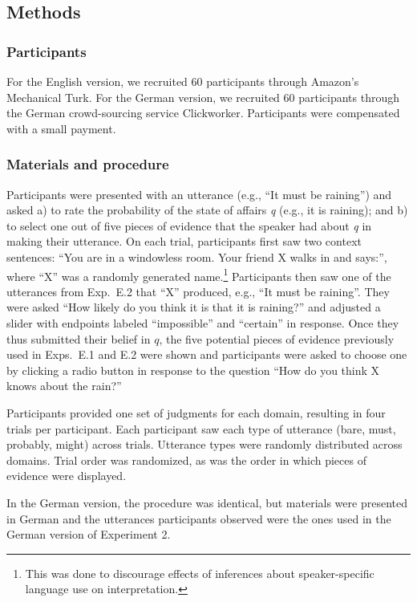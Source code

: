 \documentclass[11pt]{article}
\begin{document}
\subsection{Methods}

\subsubsection{Participants}

For the English version, we recruited 60 participants through Amazon's Mechanical Turk. 
For the German version, we recruited 60 participants through the German crowd-sourcing service Clickworker. Participants were compensated with a small payment.

\subsubsection{Materials and procedure}

Participants were presented with an utterance (e.g., ``It must be raining'') and asked a) to rate the probability of the state of affairs \emph{q} (e.g., it is raining); and b) to select one out of five pieces of evidence that the speaker had about \emph{q} in making their utterance. On each trial, participants first saw two context sentences: ``You are in a windowless room. Your friend X walks in and says:'', where ``X'' was a randomly generated name.\footnote{This was done to discourage effects of inferences about speaker-specific language use on interpretation.} Participants then saw one of the utterances from Exp.~E.2 that ``X'' produced, e.g., ``It must be raining''. They were asked ``How likely do you think it is that it is raining?'' and adjusted a slider with endpoints labeled ``impossible'' and ``certain'' in response. Once they thus submitted their belief in $q$, the five potential pieces of evidence previously used in Exps.~E.1 and E.2 were shown and participants were asked to choose one by clicking a radio button in response to the question ``How do you think X knows about the rain?'' 

Participants provided one set of judgments for each domain, resulting in four trials per participant. Each participant saw each type of utterance (bare, must, probably, might)  across trials. Utterance types were randomly distributed across domains. Trial order was randomized, as was the order in which pieces of evidence were displayed.

In the German version, the procedure was identical, but materials were presented in German and the utterances participants observed were the ones used in the German version of Experiment 2.
\end{document}
